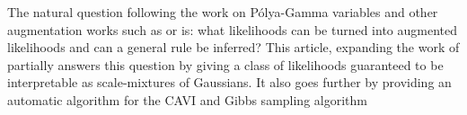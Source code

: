 


\graphicspath{{5/figures/}}

The natural question following the work on P\'olya-Gamma variables and other augmentation works such as \citet{nguyenRobustStudentSt2012} or \citet{henaoBayesianNonlinearSupport2014} is:
what likelihoods can be turned into augmented likelihoods and can a general rule be inferred?
This article, expanding the work of \citet{palmer2006variational}  partially answers this question by giving a class of likelihoods guaranteed to be interpretable as scale-mixtures of Gaussians.
It also goes further by providing an automatic algorithm for the \ac{CAVI} and Gibbs sampling algorithm 


